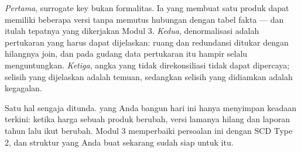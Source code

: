 \emph{Pertama}, surrogate key bukan formalitas. Ia yang membuat satu produk
dapat memiliki beberapa versi tanpa memutus hubungan dengan tabel fakta --- dan
itulah tepatnya yang dikerjakan Modul 3. \emph{Kedua}, denormalisasi adalah
pertukaran yang harus dapat dijelaskan: ruang dan redundansi ditukar dengan
hilangnya join, dan pada gudang data pertukaran itu hampir selalu
menguntungkan. \emph{Ketiga}, angka yang tidak direkonsiliasi tidak dapat
dipercaya; selisih yang dijelaskan adalah temuan, sedangkan selisih yang
didiamkan adalah kegagalan.

Satu hal sengaja ditunda.  yang Anda bangun hari ini hanya
menyimpan keadaan terkini: ketika harga sebuah produk berubah, versi lamanya
hilang dan laporan tahun lalu ikut berubah. Modul 3 memperbaiki persoalan ini
dengan SCD Type 2, dan struktur yang Anda buat sekarang sudah siap untuk itu.
